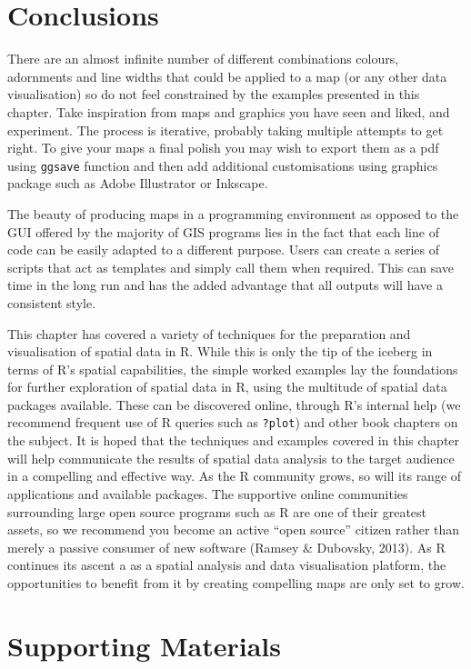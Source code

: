 \documentclass[]{article}
\begin{document}
\section{Conclusions}

There are an almost infinite number of different combinations colours,
adornments and line widths that could be applied to a map (or any other
data visualisation) so do not feel constrained by the examples presented
in this chapter. Take inspiration from maps and graphics you have seen
and liked, and experiment. The process is iterative, probably taking
multiple attempts to get right. To give your
maps a final polish you may wish to export them as a pdf using
\texttt{ggsave} function and then add additional customisations using
graphics package such as Adobe Illustrator or Inkscape.

The beauty of producing maps in a programming environment as opposed to
the GUI offered by the majority of GIS programs lies in the fact that
each line of code can be easily adapted to a different purpose. Users
can create a series of scripts that act as templates and simply call
them when required. This can save time in the long run and has the added
advantage that all outputs will have a consistent style.

This chapter has covered a variety of techniques for the preparation and
visualisation of spatial data in R. While this is only the tip of the
iceberg in terms of R's spatial capabilities, the simple worked examples
lay the foundations for further exploration of spatial data in R, using
the multitude of spatial data packages available. These can be
discovered online, through R's internal help (we recommend frequent use
of R queries such as \texttt{?plot}) and other book chapters on the
subject. It is hoped that the techniques and examples covered in this
chapter will help communicate the results of spatial data analysis to
the target audience in a compelling and effective way. As the R community grows, so will its range of
applications and available packages. The supportive online communities
surrounding large open source programs such as R are one of their
greatest assets, so we recommend you become an active ``open source''
citizen rather than merely a passive consumer of new software (Ramsey \&
Dubovsky, 2013). As R continues its ascent a as a spatial analysis and
data visualisation platform, the opportunities to benefit from it by
creating compelling maps are only set to grow.

\section{Supporting Materials}
\end{document}
